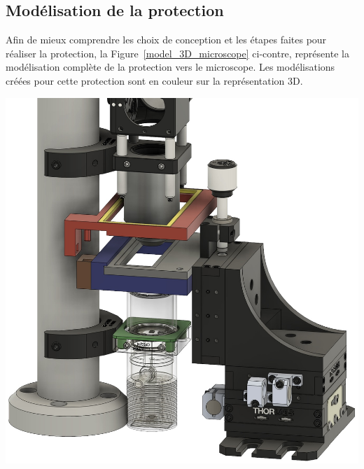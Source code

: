 \subsection{Modélisation de la protection}
\begin{minipage}[c]{0.38\textwidth}
    Afin de mieux comprendre les choix de conception et les étapes faites pour réaliser la protection, la Figure~\ref{model_3D_microscope} ci-contre, représente la modélisation complète de la protection vers le microscope. Les modélisations créées pour cette protection sont en couleur sur la représentation 3D.
\end{minipage}\hfill
\begin{minipage}[c]{0.58\textwidth}
    \begin{center}
        \includegraphics[width=\textwidth]{assets/figures/Protections_laser/Securite_mecanique/Protection_vers_microscope/model_3D.jpeg}
    \end{center}
    \label{model_3D_microscope}
\end{minipage}



